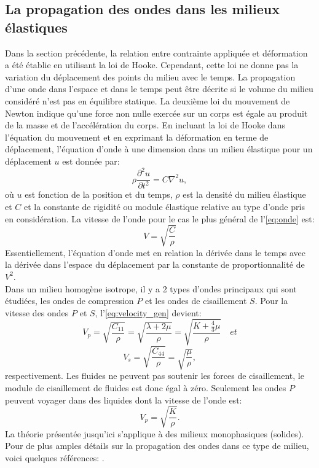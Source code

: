 \subsection*{La propagation des ondes dans les milieux élastiques}
\label{sc:prop_ondes}
Dans la section précédente, la relation entre contrainte appliquée et déformation a été établie en utilisant la loi de Hooke. Cependant, cette loi ne donne pas la variation du déplacement des points du milieu avec le temps. La propagation d’une onde dans l’espace et dans le temps peut être décrite si le volume du milieu considéré n’est pas en équilibre statique. La deuxième loi du mouvement de Newton indique qu’une force non nulle exercée sur un corps est égale au produit de la masse et de l’accélération du corps. En incluant la loi de Hooke dans l’équation du mouvement et en exprimant la déformation en terme de déplacement, l’équation d’onde à une dimension dans un milieu élastique pour un déplacement $u$ est donnée par:
\begin{equation}
\rho\frac{\partial^2 u}{\partial t^2} = C\nabla^2u,
\label{eq:onde}
\end{equation}
où $u$ est fonction de la position et du temps, $\rho$ est la densité du milieu élastique et $C$ et la constante de rigidité ou module élastique relative au type d'onde pris en considération. La vitesse de l'onde pour le cas le plus général de l'\cref{eq:onde} est:
\begin{equation}
V = \sqrt{\frac{C}{\rho}}
\label{eq:velocity_gen}
\end{equation}
Essentiellement, l’équation d’onde met en relation la dérivée dans le temps avec la dérivée dans l’espace du déplacement par la constante de proportionnalité de $V^2$.\\
Dans un milieu homogène isotrope, il y a 2 types d’ondes principaux qui sont étudiées, les ondes de compression $P$ et les ondes de cisaillement $S$. Pour la vitesse des ondes $P$ et $S$, l'\cref{eq:velocity_gen} devient:
\begin{equation}
V_p = \sqrt{\frac{C_{11}}{\rho}} = \sqrt{\frac{\lambda + 2\mu}{\rho}} = \sqrt{\frac{K+\frac{4}{3}\mu}{\rho}}\quad et
\label{eq:vitesse_p}
\end{equation}
\begin{equation}
V_s = \sqrt{\frac{C_{44}}{\rho}} = \sqrt{\frac{\mu}{\rho}} ,
\label{eq:vitesse_s}
\end{equation}
respectivement. Les fluides ne peuvent pas soutenir les forces de cisaillement, le module de cisaillement de fluides est donc égal à zéro. Seulement les ondes $P$ peuvent voyager dans des liquides dont la vitesse de l’onde est:
\begin{equation}
V_p = \sqrt{\frac{K}{\rho}} .
\label{eq:velocity_pliq}
\end{equation}
La théorie présentée jusqu'ici s'applique à des milieux monophasiques (solides). Pour de plus amples détails sur la propagation des ondes dans ce type de milieu, voici quelques références: \citet{Sheriff1995,Aki1980}.\\

